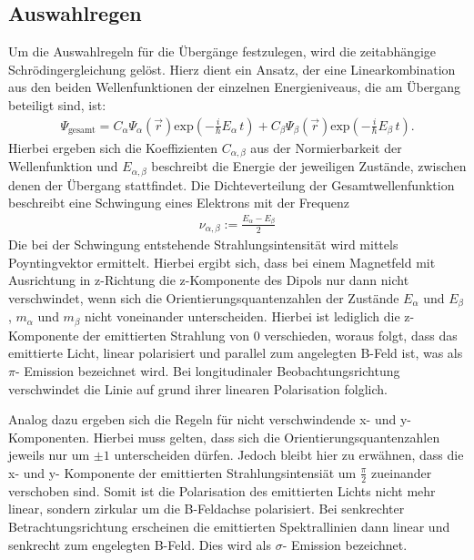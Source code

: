 \subsection{Auswahlregen}
Um die Auswahlregeln für die Übergänge festzulegen, wird die zeitabhängige Schrödingergleichung gelöst.
Hierz dient ein Ansatz, der eine Linearkombination aus den beiden Wellenfunktionen
der einzelnen Energieniveaus, die am Übergang beteiligt sind, ist:
\begin{align*}
    \Psi_{\text{gesamt}} = C_{\alpha} \Psi_{\alpha}(\vec{r}) \text{exp}\left( -\frac{i}{\hbar}E_{\alpha} \, t \right) + C_{\beta} \Psi_{\beta}(\vec{r}) \text{exp}\left( -\frac{i}{\hbar}E_{\beta} \, t \right).
\end{align*}
Hierbei ergeben sich die Koeffizienten $C_{\alpha, \beta}$ aus der Normierbarkeit der
Wellenfunktion und $E_{\alpha, \beta}$ beschreibt die Energie der jeweiligen Zustände,
zwischen denen der Übergang stattfindet.
Die Dichteverteilung der Gesamtwellenfunktion beschreibt eine Schwingung eines Elektrons
mit der Frequenz
\FloatBarrier
\begin{align*}
    \nu_{\alpha, \beta} := \frac{E_{\alpha}-E_{\beta}}{2}
\end{align*}
Die bei der Schwingung entstehende Strahlungsintensität wird mittels Poyntingvektor
ermittelt. Hierbei ergibt sich, dass bei einem Magnetfeld mit Ausrichtung in z-Richtung
die z-Komponente des Dipols nur dann nicht verschwindet, wenn sich die Orientierungsquantenzahlen
der Zustände $E_{\alpha}$ und $E_{\beta}$, $m_{\alpha}$ und $m_{\beta}$ nicht
voneinander unterscheiden. Hierbei ist lediglich die z- Komponente der emittierten Strahlung von 0
verschieden, woraus folgt, dass das emittierte Licht, linear polarisiert und parallel zum
angelegten B-Feld ist, was als $\pi$- Emission bezeichnet wird. Bei longitudinaler Beobachtungsrichtung
verschwindet die Linie auf grund ihrer linearen Polarisation folglich.

\noindent Analog dazu ergeben sich die Regeln für nicht verschwindende x- und y- Komponenten.
Hierbei muss gelten, dass sich die Orientierungsquantenzahlen jeweils nur um
$\pm 1$ unterscheiden dürfen. Jedoch bleibt hier zu erwähnen, dass die x- und y- Komponente
der emittierten Strahlungsintensiät um $\frac{\pi}{2}$ zueinander verschoben sind.
Somit ist die Polarisation des emittierten Lichts nicht mehr linear, sondern zirkular
um die B-Feldachse polarisiert. Bei senkrechter Betrachtungsrichtung erscheinen die emittierten Spektrallinien
dann linear und senkrecht zum engelegten B-Feld.
Dies wird als $\sigma$- Emission bezeichnet.

